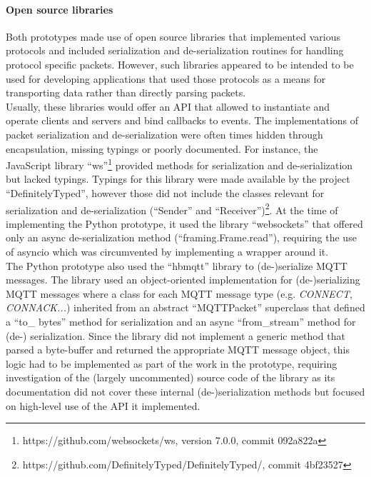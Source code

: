 \paragraph{Open source libraries} Both prototypes made use of open source libraries that implemented various protocols and included serialization and de-serialization routines for handling protocol specific packets. However, such libraries appeared to be intended to be used for developing applications that used those protocols as a means for transporting data rather than directly parsing packets.\\
Usually, these libraries would offer an API that allowed to instantiate and operate clients and servers and bind callbacks to events. The implementations of packet serialization and de-serialization were often times hidden through encapsulation, missing typings or poorly documented. For instance, the JavaScript library \enquote{ws}\footnote{https://github.com/websockets/ws, version 7.0.0, commit 092a822a} provided methods for serialization and de-serialization but lacked typings. Typings for this library were made available by the project \enquote{DefinitelyTyped}, however those did not include the classes relevant for serialization and de-serialization (\enquote{Sender} and \enquote{Receiver})\footnote{https://github.com/DefinitelyTyped/DefinitelyTyped/, commit 4bf23527}.
At the time of implementing the Python prototype, it used the library \enquote{websockets} that offered only an async de-serialization method (\enquote{framing.Frame.read}), requiring the use of asyncio which was circumvented by implementing a wrapper around it.\\
The Python prototype also used the \enquote{hbmqtt} library to (de-)serialize \ac{MQTT} messages. The library used an object-oriented implementation for (de-)serializing \ac{MQTT} messages where a class for each \ac{MQTT} message type (e.g. \emph{CONNECT}, \emph{CONNACK...}) inherited from an abstract \enquote{MQTTPacket} superclass that defined a \enquote{to\_ bytes} method for serialization and an async \enquote{from\_stream} method for (de-) serialization. Since the library did not implement a generic method that parsed a byte-buffer and returned the appropriate \ac{MQTT} message object, this logic had to be implemented as part of the work in the prototype, requiring investigation of the (largely uncommented) source code of the library as its documentation did not cover these internal (de-)serialization methods but focused on high-level use of the API it implemented.\\
